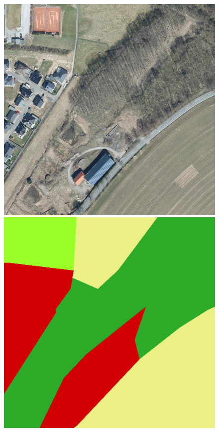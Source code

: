 {\begin{figure}
    \vspace{2mm}
    \includegraphics[width=\DiscussionImageWidth]{images/segmentation_discussion/images/755.png} \hfill
    \includegraphics[width=\DiscussionImageWidth]{images/segmentation_discussion/labels/755.png} \hfill

\end{figure}}

